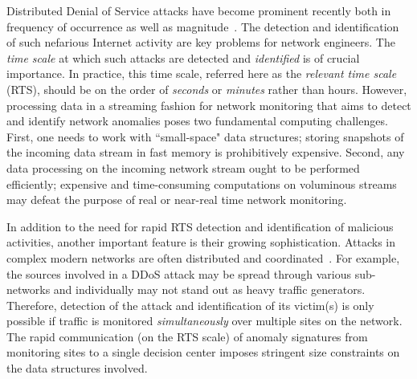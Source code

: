 \documentclass[10pt, conference, letterpaper,onecolumn]{IEEEtranv1.8}
\theoremstyle{plain}\newtheorem{thm}{Theorem}\newtheorem{lem}{Lemma}
\theoremstyle{definition}
\begin{document}
Distributed Denial of Service attacks have become prominent recently both in frequency of occurrence as
well as magnitude~\cite{rossow}.  The detection and identification of such nefarious Internet activity are key problems for network engineers. The {\em time scale} at which such attacks 
are detected and {\em identified}
is of crucial importance. In practice, this time scale, referred here as the {\em relevant time scale} (RTS),
should be on the order of {\em seconds} or {\em minutes} rather than hours. 
However, processing data in a streaming fashion for network monitoring
that aims to detect and identify network anomalies
poses two fundamental computing challenges. First, one needs to work
with ``small-space" data structures;  storing snapshots of the incoming data stream  in fast memory
 is prohibitively expensive. 
Second, any data processing  on the incoming network stream 
ought to be performed efficiently; expensive and time-consuming
computations on voluminous streams may defeat the purpose of
real or near-real time network monitoring.

In addition to the need for rapid RTS detection and identification of malicious activities, another important feature is their growing
sophistication.  Attacks in complex modern networks are often distributed and coordinated~\cite{rossow}. For example, the sources involved in a 
DDoS attack may be spread through various sub-networks and individually may not stand out as heavy traffic generators. Therefore, 
detection of the attack and identification of its victim(s) is only possible if traffic is monitored  {\em simultaneously} over multiple sites on 
the network. The rapid communication (on the RTS scale) of anomaly signatures from monitoring sites to a single decision center imposes stringent 
size constraints on the data structures involved.
 
\end{document}
